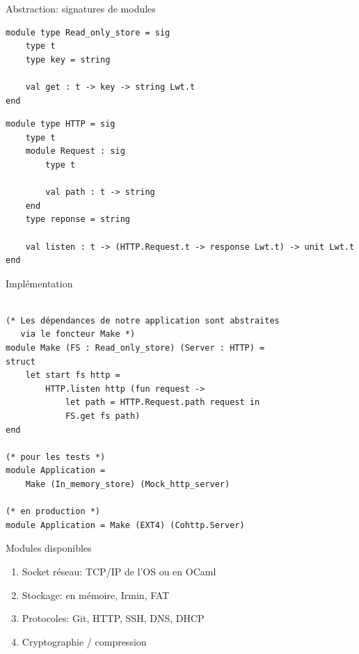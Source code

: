 \begin{frame}[fragile]{Abstraction: signatures de modules}

\begin{lstlisting}
module type Read_only_store = sig 
    type t
    type key = string
    
    val get : t -> key -> string Lwt.t
end
\end{lstlisting}

\begin{lstlisting}
module type HTTP = sig
    type t
    module Request : sig 
        type t
        
        val path : t -> string
    end
    type reponse = string
    
    val listen : t -> (HTTP.Request.t -> response Lwt.t) -> unit Lwt.t
end
\end{lstlisting}


\end{frame}

\begin{frame}[fragile]{Implémentation}
    
\begin{lstlisting}

(* Les dépendances de notre application sont abstraites 
   via le foncteur Make *)
module Make (FS : Read_only_store) (Server : HTTP) = 
struct
    let start fs http =
        HTTP.listen http (fun request ->
            let path = HTTP.Request.path request in
            FS.get fs path)
end

(* pour les tests *)
module Application = 
    Make (In_memory_store) (Mock_http_server)

(* en production *)
module Application = Make (EXT4) (Cohttp.Server)
\end{lstlisting}

\end{frame}

\begin{frame}{Modules disponibles}
\begin{enumerate}[label=$-$]
    \item Socket réseau: TCP/IP de l'OS ou en OCaml
    \item Stockage: en mémoire, Irmin, FAT
    \item Protocoles: Git, HTTP, SSH, DNS, DHCP
    \item Cryptographie / compression
\end{enumerate}
\end{frame}


